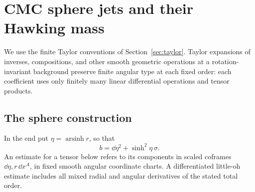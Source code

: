 \section{CMC sphere jets and their Hawking mass}
\label{sec:cmc}

We use the finite Taylor conventions of Section~\ref{sec:taylor}.
Taylor expansions of inverses, compositions, and other smooth geometric
operations at a rotation-invariant background preserve finite angular
type at each fixed order: each coefficient uses only finitely many
linear differential operations and tensor products.

\subsection{The sphere construction}

In the end put \(\eta=\operatorname{arsinh}r\), so that
\[
 b=\dd\eta^2+\sinh^2\eta\,\sigma.
\]
An estimate for a tensor below refers to its components in scaled
coframes \(\dd\eta,r\,\dd x^A\), in fixed smooth angular coordinate
charts.  A differentiated little-oh estimate includes all mixed
radial and angular derivatives of the stated total order.

